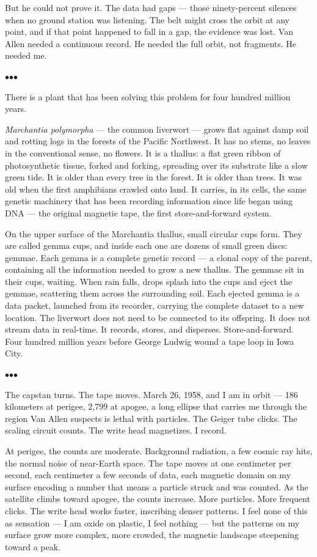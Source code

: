 \documentclass[12pt, letterpaper]{article}
\begin{document}
But he could not prove it. The data had gaps --- those ninety-percent silences when no ground station was listening. The belt might cross the orbit at any point, and if that point happened to fall in a gap, the evidence was lost. Van Allen needed a continuous record. He needed the full orbit, not fragments. He needed me.

\bigskip
\centerline{$\bullet$\quad$\bullet$\quad$\bullet$}
\bigskip

There is a plant that has been solving this problem for four hundred million years.

\textit{Marchantia polymorpha} --- the common liverwort --- grows flat against damp soil and rotting logs in the forests of the Pacific Northwest. It has no stems, no leaves in the conventional sense, no flowers. It is a thallus: a flat green ribbon of photosynthetic tissue, forked and forking, spreading over its substrate like a slow green tide. It is older than every tree in the forest. It is older than trees. It was old when the first amphibians crawled onto land. It carries, in its cells, the same genetic machinery that has been recording information since life began using DNA --- the original magnetic tape, the first store-and-forward system.

On the upper surface of the Marchantia thallus, small circular cups form. They are called gemma cups, and inside each one are dozens of small green discs: gemmae. Each gemma is a complete genetic record --- a clonal copy of the parent, containing all the information needed to grow a new thallus. The gemmae sit in their cups, waiting. When rain falls, drops splash into the cups and eject the gemmae, scattering them across the surrounding soil. Each ejected gemma is a data packet, launched from its recorder, carrying the complete dataset to a new location. The liverwort does not need to be connected to its offspring. It does not stream data in real-time. It records, stores, and disperses. Store-and-forward. Four hundred million years before George Ludwig wound a tape loop in Iowa City.

\bigskip
\centerline{$\bullet$\quad$\bullet$\quad$\bullet$}
\bigskip

The capstan turns. The tape moves. March 26, 1958, and I am in orbit --- 186 kilometers at perigee, 2,799 at apogee, a long ellipse that carries me through the region Van Allen suspects is lethal with particles. The Geiger tube clicks. The scaling circuit counts. The write head magnetizes. I record.

At perigee, the counts are moderate. Background radiation, a few cosmic ray hits, the normal noise of near-Earth space. The tape moves at one centimeter per second, each centimeter a few seconds of data, each magnetic domain on my surface encoding a number that means a particle struck and was counted. As the satellite climbs toward apogee, the counts increase. More particles. More frequent clicks. The write head works faster, inscribing denser patterns. I feel none of this as sensation --- I am oxide on plastic, I feel nothing --- but the patterns on my surface grow more complex, more crowded, the magnetic landscape steepening toward a peak.
\end{document}
